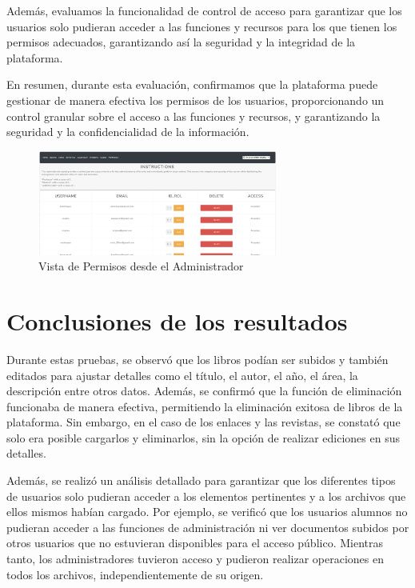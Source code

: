 \documentclass[a4paper, 12pt]{book}
\begin{document}
Además, evaluamos la funcionalidad de control de acceso para garantizar que los usuarios solo pudieran acceder a las funciones y recursos para los que tienen los 
permisos adecuados, garantizando así la seguridad y la integridad de la plataforma.

En resumen, durante esta evaluación, confirmamos que la plataforma puede gestionar de manera efectiva los permisos de los usuarios, proporcionando un control 
granular sobre el acceso a las funciones y recursos, y garantizando la seguridad y la confidencialidad de la información.
\begin{figure}
  \centering
  \includegraphics[width=0.7\textwidth]{img/permisos.png}
  \caption{Vista de Permisos desde el Administrador}
  \label{fig:permisosadmin}
\end{figure}

\section{Conclusiones de los resultados}
\label{sec:resultados}

Durante estas pruebas, se observó que los libros podían ser subidos y también editados para ajustar detalles como el título, el autor, el año, el área, la descripción 
entre otros datos. 
Además, se confirmó que la función de eliminación funcionaba de manera efectiva, permitiendo la eliminación exitosa de libros de la plataforma. Sin embargo, 
en el caso de los enlaces y las revistas, se constató que solo era posible cargarlos y eliminarlos, sin la opción de realizar ediciones en sus detalles.

Además, se realizó un análisis detallado para garantizar que los diferentes tipos de usuarios solo pudieran acceder a los elementos pertinentes y a los 
archivos que ellos mismos habían cargado. Por ejemplo, se verificó que los usuarios alumnos no pudieran acceder a las funciones de administración ni ver 
documentos subidos por otros usuarios que no estuvieran disponibles para el acceso público. Mientras tanto, los administradores tuvieron acceso y pudieron 
realizar operaciones en todos los archivos, independientemente de su origen.
\end{document}
